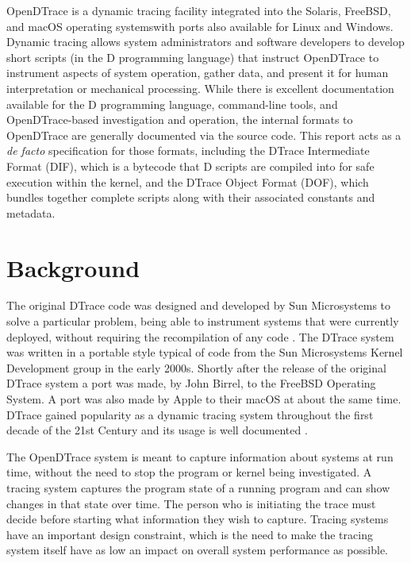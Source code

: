 OpenDTrace is a dynamic tracing facility integrated into the Solaris,
FreeBSD, and macOS operating systems\textemdash with ports also available for
Linux and Windows.  Dynamic tracing allows system administrators and
software developers to develop short scripts (in the D programming
language) that instruct OpenDTrace to instrument aspects of system
operation, gather data, and present it for human interpretation or
mechanical processing.  While there is excellent documentation
available for the D programming language, command-line tools, and
OpenDTrace-based investigation and operation, the internal formats to
OpenDTrace are generally documented via the source code.  This report
acts as a \textit{de facto} specification for those formats, including the
DTrace Intermediate Format (DIF), which is a bytecode that D scripts
are compiled into for safe execution within the kernel, and the DTrace
Object Format (DOF), which bundles together complete scripts along
with their associated constants and metadata.

\section{Background}

The original DTrace code was designed and developed by Sun
Microsystems to solve a particular problem, being able to instrument
systems that were currently deployed, without requiring the
recompilation of any code \cite{DTrace2004}.  The DTrace system was
written in a portable style typical of code from the Sun Microsystems
Kernel Development group in the early 2000s.  Shortly after the
release of the original DTrace system a port was made, by John Birrel,
to the FreeBSD Operating System.  A port was also made by Apple to
their macOS at about the same time.  DTrace gained popularity as a
dynamic tracing system throughout the first decade of the 21st Century
and its usage is well documented
\cite{mckusick2014design}\cite{Microsystems2008a}\cite{Gregg:2011:DDT:1971960}.

The OpenDTrace system is meant to capture information about systems at
run time, without the need to stop the program or kernel being
investigated.  
A tracing system captures the program state of a running program and
can show changes in that state over time.  The person who is
initiating the trace must decide before starting what information they
wish to capture.  Tracing systems have an important design constraint,
which is the need to make the tracing system itself have as low an
impact on overall system performance as possible.

